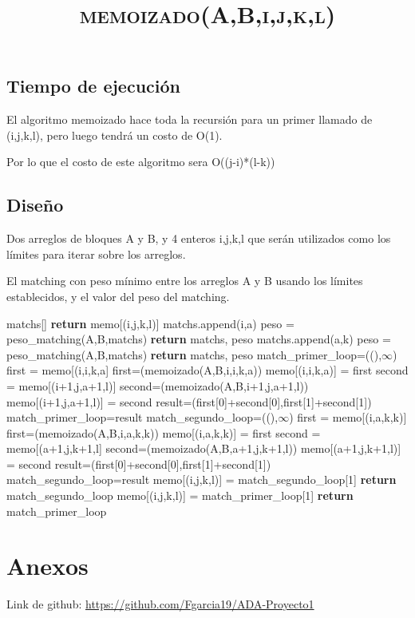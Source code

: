 \documentclass{article}
\begin{document}
\subsection{Tiempo de ejecución}

El algoritmo memoizado hace toda la recursión para un primer llamado de (i,j,k,l), pero luego tendrá un costo de O(1). 

Por lo que el costo de este algoritmo sera O((j-i)*(l-k))

\subsection{Diseño}

\begin{algorithmic}
\Require Dos arreglos de bloques A y B, y 4 enteros i,j,k,l que serán utilizados como los límites para iterar sobre los arreglos. 

\Ensure El matching con peso mínimo entre los arreglos A y B usando los límites establecidos, y el valor del peso del matching.

\title{\textsc{memoizado(A,B,i,j,k,l)}}
\State matchs[]
\State \textbf{return} memo[(i,j,k,l)]
\EndIf
{}
\State matchs.append(i,a)
\EndFor
\State peso = peso\_matching(A,B,matchs)
\State \textbf{return} matchs, peso
\EndIf
\State 
{}
\State matchs.append(a,k)
\EndFor
\State peso = peso\_matching(A,B,matchs)
\State \textbf{return} matchs, peso
\EndIf
\State
\State match\_primer\_loop=((),$\infty$)
\State first = memo[(i,i,k,a]
\Else
\State first=(memoizado(A,B,i,i,k,a))
\State memo[(i,i,k,a)] = first
\EndIf
{}
\State second = memo[(i+1,j,a+1,l)]
\Else
\State second=(memoizado(A,B,i+1,j,a+1,l))
\State memo[(i+1,j,a+1,l)] = second
\EndIf
\State result=(first[0]+second[0],first[1]+second[1])
\State match\_primer\_loop=result
\EndIf
\EndFor
\State
\State match\_segundo\_loop=((),$\infty$)
\State first = memo[(i,a,k,k)]
\Else
\State first=(memoizado(A,B,i,a,k,k))
\State memo[(i,a,k,k)] = first
\EndIf
{}
\State second = memo[(a+1,j,k+1,l]
\Else
\State second=(memoizado(A,B,a+1,j,k+1,l))
\State memo[(a+1,j,k+1,l)] = second
\EndIf
\State result=(first[0]+second[0],first[1]+second[1])
\State match\_segundo\_loop=result
\EndIf
\EndFor
\State
{}
\State memo[(i,j,k,l)] = match\_segundo\_loop[1]
\State \textbf{return} match\_segundo\_loop
\EndIf
\State memo[(i,j,k,l)] = match\_primer\_loop[1]
\State \textbf{return} match\_primer\_loop

\end{algorithmic}



\section{Anexos}
Link de github:
\url{https://github.com/Fgarcia19/ADA-Proyecto1}
\end{document}
